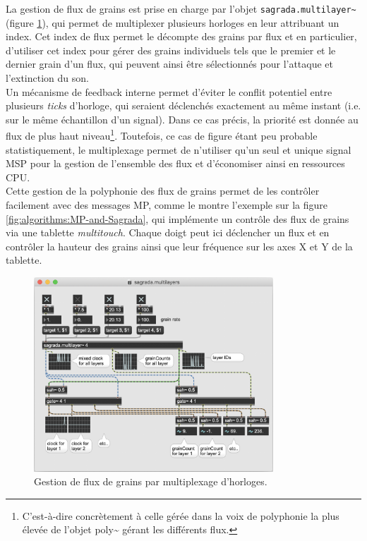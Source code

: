 \noindent La gestion de flux de grains est prise en charge par l'objet \verb|sagrada.multilayer~| (figure \ref{fig:algorithms:MP-multilayers}), qui permet de multiplexer plusieurs horloges en leur attribuant un index. Cet index de flux permet le décompte des grains par flux et en particulier, d'utiliser cet index pour gérer des grains individuels tels que le premier et le dernier grain d'un flux, qui peuvent ainsi être sélectionnés pour l'attaque et l'extinction du son.\\
\indent Un mécanisme de feedback interne permet d'éviter le conflit potentiel entre plusieurs \textit{ticks} d'horloge, qui seraient déclenchés exactement au même instant (i.e. sur le même échantillon d'un signal). Dans ce cas précis, la priorité est donnée au flux de plus haut niveau\footnote{C'est-à-dire concrètement à celle gérée dans la voix de polyphonie la plus élevée de l'objet poly\textasciitilde{} gérant les différents flux.}. Toutefois, ce cas de figure étant peu probable statistiquement, le multiplexage permet de n'utiliser qu'un seul et unique signal \gls{MSP} pour la gestion de l'ensemble des flux et d'économiser ainsi en ressources \gls{CPU}.\\
\indent Cette gestion de la polyphonie des flux de grains permet de les contrôler facilement avec des messages MP, comme le montre l'exemple sur la figure \ref{fig:algorithms:MP-and-Sagrada}, qui implémente un contrôle des flux de grains via une tablette \textit{multitouch}. Chaque doigt peut ici déclencher un flux et en contrôler la hauteur des grains ainsi que leur fréquence sur les axes X et Y de la tablette.

\begin{figure}[!htbp]
	\captionsetup{format=plain}
	\includegraphics[width=0.8\textwidth]{gfx/04_algorithms/Sagrada-multilayers.png}
	\caption[Sagrada : gestion de flux de grains]{Gestion de flux de grains par multiplexage d'horloges.}
	\label{fig:algorithms:MP-multilayers}
\end{figure}

